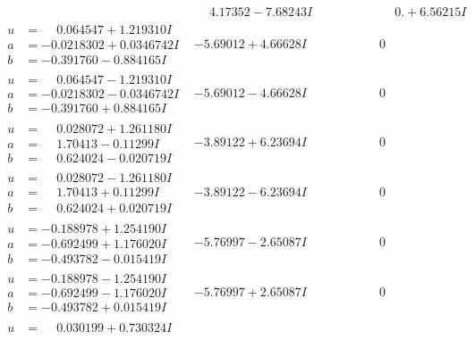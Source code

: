 \documentclass[1p]{elsarticle_modified}
\theoremstyle{definition}
\begin{document}
$$\begin{array}{c|c|c}
 & \phantom{-}4.17352 - 7.68243 I & \phantom{-0.000000 -}0. + 6.56215 I \\ \hline\begin{aligned}
u &= \phantom{-}0.064547 + 1.219310 I \\
a &= -0.0218302 + 0.0346742 I \\
b &= -0.391760 - 0.884165 I\end{aligned}
 & -5.69012 + 4.66628 I & \phantom{-0.000000 } 0 \\ \hline\begin{aligned}
u &= \phantom{-}0.064547 - 1.219310 I \\
a &= -0.0218302 - 0.0346742 I \\
b &= -0.391760 + 0.884165 I\end{aligned}
 & -5.69012 - 4.66628 I & \phantom{-0.000000 } 0 \\ \hline\begin{aligned}
u &= \phantom{-}0.028072 + 1.261180 I \\
a &= \phantom{-}1.70413 - 0.11299 I \\
b &= \phantom{-}0.624024 - 0.020719 I\end{aligned}
 & -3.89122 + 6.23694 I & \phantom{-0.000000 } 0 \\ \hline\begin{aligned}
u &= \phantom{-}0.028072 - 1.261180 I \\
a &= \phantom{-}1.70413 + 0.11299 I \\
b &= \phantom{-}0.624024 + 0.020719 I\end{aligned}
 & -3.89122 - 6.23694 I & \phantom{-0.000000 } 0 \\ \hline\begin{aligned}
u &= -0.188978 + 1.254190 I \\
a &= -0.692499 + 1.176020 I \\
b &= -0.493782 - 0.015419 I\end{aligned}
 & -5.76997 - 2.65087 I & \phantom{-0.000000 } 0 \\ \hline\begin{aligned}
u &= -0.188978 - 1.254190 I \\
a &= -0.692499 - 1.176020 I \\
b &= -0.493782 + 0.015419 I\end{aligned}
 & -5.76997 + 2.65087 I & \phantom{-0.000000 } 0 \\ \hline\begin{aligned}
u &= \phantom{-}0.030199 + 0.730324 I \\

\end{aligned}
\end{array}$$
\end{document}
